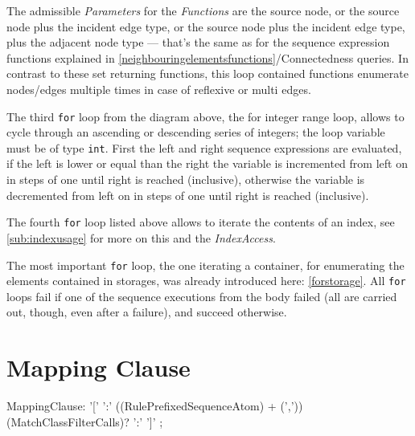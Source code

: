 The admissible \emph{Parameters} for the \emph{Functions} are the source node, or the source node plus the incident edge type, or the source node plus the incident edge type, plus the adjacent node type ---
that's the same as for the sequence expression functions explained in \ref{neighbouringelementsfunctions}/Connectedness queries.
In contrast to these set returning functions, this loop contained functions enumerate nodes/edges multiple times in case of reflexive or multi edges.

The third \texttt{for} loop from the diagram above, the for integer range loop, allows to cycle through an ascending or descending series of integers; the loop variable must be of type \texttt{int}.
First the left and right sequence expressions are evaluated,
if the left is lower or equal than the right the variable is incremented from left on in steps of one until right is reached (inclusive),
otherwise the variable is decremented from left on in steps of one until right is reached (inclusive).

The fourth \texttt{for} loop listed above allows to iterate the contents of an index, see \ref{sub:indexusage} for more on this and the \emph{IndexAccess}.

The most important \texttt{for} loop, the one iterating a container, for enumerating the elements contained in storages, was already introduced here: \ref{forstorage}.
All \texttt{for} loops fail if one of the sequence executions from the body failed (all are carried out, though, even after a failure), and succeed otherwise.


\section{Mapping Clause} \label{sec:mappingclause}


\begin{rail}
  MappingClause: '[' ':' ((RulePrefixedSequenceAtom) + (',')) (MatchClassFilterCalls)? ':' ']' ;
\end{rail}

